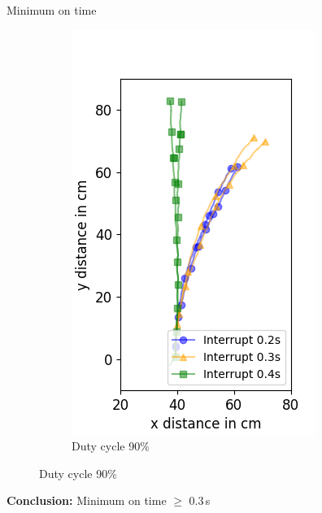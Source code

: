 \documentclass{beamer}
\begin{document}
\begin{frame}{Minimum on time}
\begin{figure}
\begin{subfigure}[b]{0.28\textwidth}
			\includegraphics[width=\textwidth]{pics/figure_90.png}
			\caption*{Duty cycle 90\%}
		\end{subfigure}
	\end{figure}
	\pause
	\textbf{Conclusion:} Minimum on time $\geq$ 0.3\,s
\end{frame}
\end{document}

